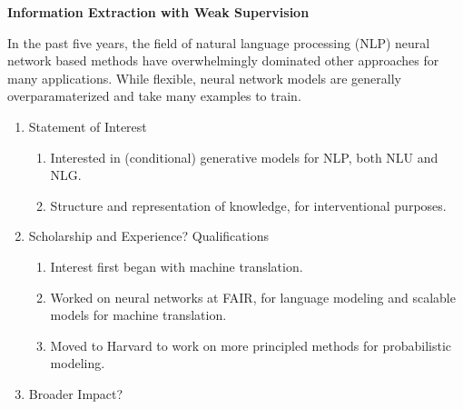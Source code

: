\documentclass[11pt]{article}
\begin{document}

\begin{center}
\textbf{Information Extraction with Weak Supervision}
\end{center}

In the past five years, the field of natural language processing (NLP)
neural network based methods have overwhelmingly dominated other approaches for many applications.
While flexible, neural network models are generally overparamaterized and take many examples to train.


\begin{enumerate}
\item Statement of Interest
    \begin{enumerate}
    \item Interested in (conditional) generative models for NLP, both NLU and NLG.
    \item Structure and representation of knowledge, for interventional purposes.
    \end{enumerate}
\item Scholarship and Experience? Qualifications
    \begin{enumerate}
    \item Interest first began with machine translation.
    \item Worked on neural networks at FAIR, for language modeling and scalable
        models for machine translation.
    \item Moved to Harvard to work on more principled methods for probabilistic modeling.
    \end{enumerate}
\item Broader Impact?


\end{enumerate}
\end{document}
